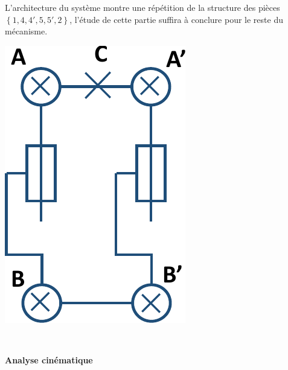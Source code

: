 \begin{minipage}{0.7\linewidth}
L'architecture du système montre une répétition de la structure des pièces $\left\{1,4,4',5,5',2\right\}$, l'étude de cette partie suffira à conclure pour le reste du mécanisme.
\end{minipage}\hfill
\begin{minipage}{0.25\linewidth}
\begin{center}
 \includegraphics[width=0.6\linewidth]{img/schema_cinematique}
\end{center}
\end{minipage}\hfill

~\

\textbf{Analyse cinématique}

